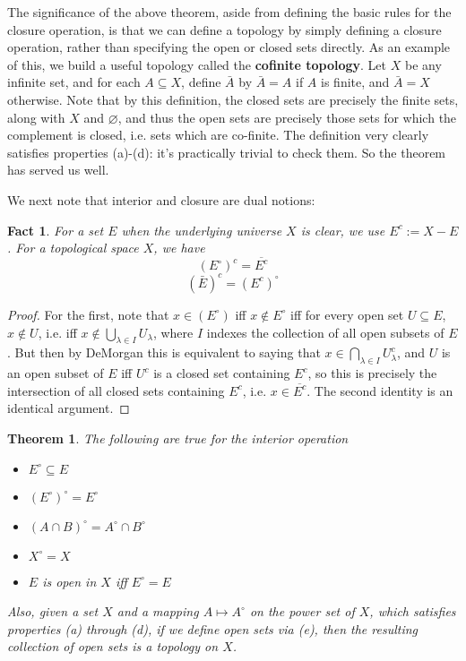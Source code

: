 \documentclass{article}
\theoremstyle{definition}
\theoremstyle{plain}
\theoremstyle{theorem}
\newtheorem{fact}{Fact}[section]
\newtheorem{theorem}{Theorem}[section]
\begin{document}
	The significance of the above theorem, aside from defining the basic rules for the closure operation, is that we can define a topology by simply defining a closure operation, rather than specifying the open or closed sets directly. As an example of this, we build a useful topology called the \textbf{cofinite topology}. Let $X$ be any infinite set, and for each $A \subseteq X$, define $\bar{A}$ by $\bar{A} = A$ if $A$ is finite, and $\bar{A} = X$ otherwise. Note that by this definition, the closed sets are precisely the finite sets, along with $X$ and $\varnothing$, and thus the open sets are precisely those sets for which the complement is closed, i.e. sets which are co-finite. The definition very clearly satisfies properties (a)-(d): it's practically trivial to check them. So the theorem has served us well. 
	\par We next note that interior and closure are dual notions: 
	\begin{fact}
		For a set $E$ when the underlying universe $X$ is clear, we use $E^c := X-E$. For a topological space $X$, we have
		\[ (E^{\circ})^c = \overline{E^c} \]
		\[ (\bar{E})^c = (E^c)^{\circ} \]
	\end{fact}
	\begin{proof}
		For the first, note that $x \in (E^{\circ})$ iff $x \notin E^{\circ}$ iff for every open set $U \subseteq E$, $x \notin U$, i.e. iff $x \notin \bigcup_{\lambda \in I} U_{\lambda}$, where $I$ indexes the collection of all open subsets of $E$. But then by DeMorgan this is equivalent to saying that $x \in \bigcap_{\lambda \in I} U_{\lambda}^c$, and $U$ is an open subset of $E$ iff $U^c$ is a closed set containing $E^c$, so this is precisely the intersection of all closed sets containing $E^c$, i.e. $x \in \overline{E^c}$. The second identity is an identical argument.
	\end{proof}
	\begin{theorem}
		The  following are true for the interior operation
		\begin{itemize}
			\item[(a)] $E^{\circ} \subseteq E$
			\item[(b)] $(E^{\circ})^{\circ} = E^{\circ}$
			\item[(c)] $(A \cap B)^{\circ} = A^{\circ} \cap B^{\circ}$
			\item[(d)] $X^{\circ} = X$
			\item[(e)] $E$ is open in $X$ iff $E^{\circ} = E$
		\end{itemize}
		Also, given a set $X$ and a mapping $A \mapsto A^{\circ}$ on the power set of $X$, which satisfies properties (a) through (d), if we define open sets via (e), then the resulting collection of open sets is a topology on $X$. 
	\end{theorem}
\end{document}
